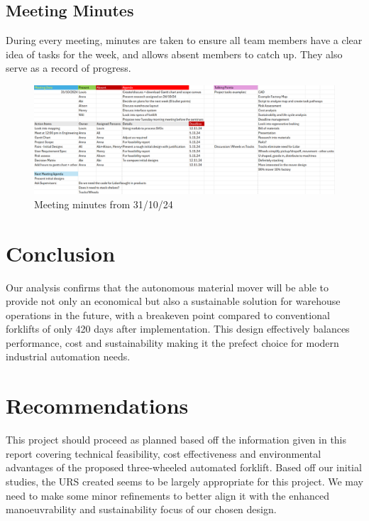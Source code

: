 \documentclass[12pt,titlepage]{article}
\begin{document}
 \subsection{Meeting Minutes}
   \FloatBarrier
During every meeting, minutes are taken to ensure all team members have a clear idea of tasks for the week, and allows absent members to catch up. They also serve as a record of progress.
\FloatBarrier{}
 \begin{figure}[h]
    \includegraphics[width=1\textwidth]{HalloweenMinutes1.png}
    \vspace{-15pt}
    \caption{Meeting minutes from 31/10/24}
    \label{fig:y}
\end{figure}


\FloatBarrier
\vspace{-5pt}
\section{Conclusion}
\vspace{-10pt}
 Our analysis confirms that the autonomous material mover will be able to provide not only an economical but also a sustainable solution for warehouse operations in the future, with a breakeven point compared to conventional forklifts of only 420 days after implementation. This design effectively balances performance, cost and sustainability making it the prefect choice for modern industrial automation needs.
\vspace{-5pt}
\section{Recommendations}
\vspace{-10pt}
This project should proceed as planned based off the information given in this report covering technical feasibility, cost effectiveness and environmental advantages of the proposed three-wheeled automated forklift. Based off our initial studies, the URS created seems to be largely appropriate for this project. We may need to make some minor refinements to better align it with the enhanced manoeuvrability and sustainability focus of our chosen design.
\end{document}

